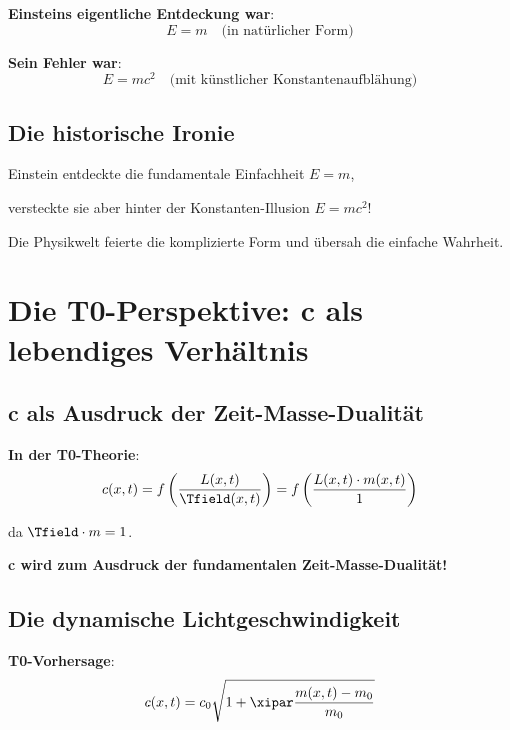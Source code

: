 	\textbf{Einsteins eigentliche Entdeckung war}:
	\begin{equation}
		E = m \quad \text{(in natürlicher Form)}
	\end{equation}
	
	\textbf{Sein Fehler war}:
	\begin{equation}
		E = mc^2 \quad \text{(mit künstlicher Konstantenaufblähung)}
	\end{equation}
	
	\subsection{Die historische Ironie}
	
	\begin{tcolorbox}[colback=blue!5!white,colframe=blue!75!black,title=Die große Ironie]
		Einstein entdeckte die fundamentale Einfachheit $E = m$, 
		
		versteckte sie aber hinter der Konstanten-Illusion $E = mc^2$!
		
		Die Physikwelt feierte die komplizierte Form und übersah die einfache Wahrheit.
	\end{tcolorbox}
	
	\section{Die T0-Perspektive: c als lebendiges Verhältnis}
	
	\subsection{c als Ausdruck der Zeit-Masse-Dualität}
	
	\textbf{In der T0-Theorie}:
	\begin{equation}
		c(x,t) = f\left(\frac{L(x,t)}{\Tfield(x,t)}\right) = f\left(\frac{L(x,t) \cdot m(x,t)}{1}\right)
	\end{equation}
	
	da $\Tfield \cdot m = 1$.
	
	\textbf{c wird zum Ausdruck der fundamentalen Zeit-Masse-Dualität!}
	
	\subsection{Die dynamische Lichtgeschwindigkeit}
	
	\textbf{T0-Vorhersage}: 
	\begin{equation}
		c(x,t) = c_0 \sqrt{1 + \xipar \frac{m(x,t) - m_0}{m_0}}
	\end{equation}
	
